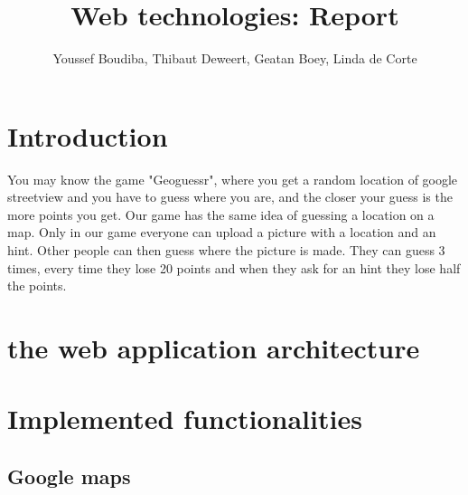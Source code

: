 \documentclass[11pt, oneside]{article}   	%
\title{Web technologies: Report}
\author{Youssef Boudiba, Thibaut Deweert, Geatan Boey, Linda de Corte }
\date{}							%
\begin{document}
\maketitle
\clearpage

\tableofcontents
\clearpage


\section{Introduction}
You may know the game "Geoguessr", where you get a random location of google streetview and you have to guess where you are, and the closer your guess is the more points you get. 
Our game has the same idea of guessing a location on a map. Only in our game everyone can upload a picture with a location and an hint. Other people can then guess where the picture is made. They can guess 3 times, every time they lose 20 points and when they ask for an hint they lose half the points.

\section{ the web application architecture}


\section{Implemented functionalities}
\subsection{Google maps}






 
\end{document}
